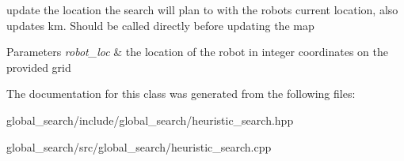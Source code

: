 update the location the search will plan to with the robot\textquotesingle{}s current location, also updates km. Should be called directly before updating the map 


\begin{DoxyParams}{Parameters}
{\em robot\+\_\+loc} & the location of the robot in integer coordinates on the provided grid \\
\hline
\end{DoxyParams}


The documentation for this class was generated from the following files\+:\begin{DoxyCompactItemize}
\item 
global\+\_\+search/include/global\+\_\+search/heuristic\+\_\+search.\+hpp\item 
global\+\_\+search/src/global\+\_\+search/heuristic\+\_\+search.\+cpp\end{DoxyCompactItemize}

